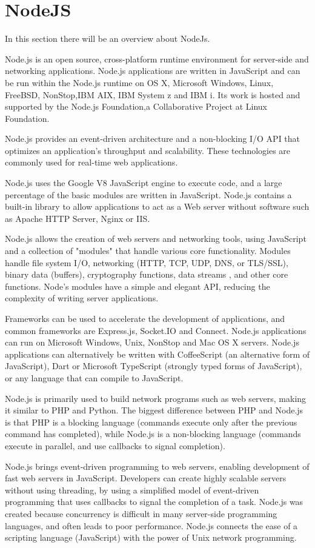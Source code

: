 \section{NodeJS}
\label{sec:TCH_nodejs}

In this section there will be an overview about NodeJs.

Node.js is an open source, cross-platform runtime environment for server-side and networking applications. Node.js applications are written in JavaScript and can be run within the Node.js runtime on OS X, Microsoft Windows, Linux, FreeBSD, NonStop,IBM AIX, IBM System z and IBM i. Its work is hosted and supported by the Node.js Foundation,a Collaborative Project at Linux Foundation.

Node.js provides an event-driven architecture and a non-blocking I/O API that optimizes an application's throughput and scalability. These technologies are commonly used for real-time web applications.

Node.js uses the Google V8 JavaScript engine to execute code, and a large percentage of the basic modules are written in JavaScript. Node.js contains a built-in library to allow applications to act as a Web server without software such as Apache HTTP Server, Nginx or IIS.

Node.js allows the creation of web servers and networking tools, using JavaScript and a collection of "modules" that handle various core functionality. Modules handle file system I/O, networking (HTTP, TCP, UDP, DNS, or TLS/SSL), binary data (buffers), cryptography functions, data streams , and other core functions. Node's modules have a simple and elegant API, reducing the complexity of writing server applications.

Frameworks can be used to accelerate the development of applications, and common frameworks are Express.js, Socket.IO and Connect. Node.js applications can run on Microsoft Windows, Unix, NonStop and Mac OS X servers. Node.js applications can alternatively be written with CoffeeScript (an alternative form of JavaScript), Dart or Microsoft TypeScript (strongly typed forms of JavaScript), or any language that can compile to JavaScript.

Node.js is primarily used to build network programs such as web servers, making it similar to PHP and Python. The biggest difference between PHP and Node.js is that PHP is a blocking language (commands execute only after the previous command has completed), while Node.js is a non-blocking language (commands execute in parallel, and use callbacks to signal completion).

Node.js brings event-driven programming to web servers, enabling development of fast web servers in JavaScript. Developers can create highly scalable servers without using threading, by using a simplified model of event-driven programming that uses callbacks to signal the completion of a task. Node.js was created because concurrency is difficult in many server-side programming languages, and often leads to poor performance. Node.js connects the ease of a scripting language (JavaScript) with the power of Unix network programming.
